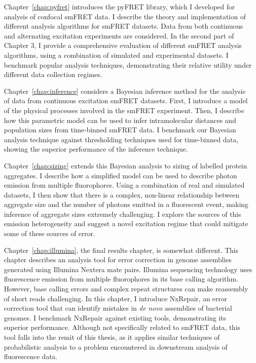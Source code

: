 Chapter~\ref{chap:pyfret} introduces the pyFRET library, which I developed for analysis of confocal smFRET data. I describe the theory and implementation of different analysis algorithms for smFRET datasets. Data from both continuous and alternating excitation experiments are considered. In the second part of Chapter 3, I provide a comprehensive evaluation of different smFRET analysis algorithms, using a combination of simulated and experimental datasets. I benchmark popular analysis techniques, demonstrating their relative utility under different data collection regimes. 


Chapter~\ref{chap:inference} considers a Bayesian inference method for the analysis of data from continuous excitation smFRET datasets. First, I introduce a model of the physical processes involved in the smFRET experiment. Then, I describe how this parametric model can be used to infer intramolecular distances and population sizes from time-binned smFRET data. I benchmark our Bayesian analysis technique against thresholding techniques used for time-binned data, showing the superior performance of the inference technique.

Chapter~\ref{chap:sizing} extends this Bayesian analysis to sizing of labelled protein aggregates. I describe how a simplified model can be used to describe photon emission from multiple fluorophores. Using a combination of real and simulated datasets, I then show that there is a complex, non-linear relationship between aggregate size and the number of photons emitted in a fluorescent event, making inference of aggregate sizes extremely challenging. I explore the sources of this emission heterogeneity and suggest a novel excitation regime that could mitigate some of these sources of error.

Chapter~\ref{chap:illumina}, the final results chapter, is somewhat different. This chapter describes an analysis tool for error correction in genome assemblies generated using Illumina Nextera mate pairs. Illumina sequencing technology uses fluorescence emission from multiple fluorophores in its base calling algorithm. However, base calling errors and complex repeat structures can make reassembly of short reads challenging. In this chapter, I introduce NxRepair, an error correction tool that can identify mistakes in \emph{de novo} assemblies of bacterial genomes. I benchmark NxRepair against existing tools, demonstrating its superior performance. Although not specifically related to smFRET data, this tool falls into the remit of this thesis, as it applies similar techniques of probabilistic analysis to a problem encountered in downstream analysis of fluorescence data.

